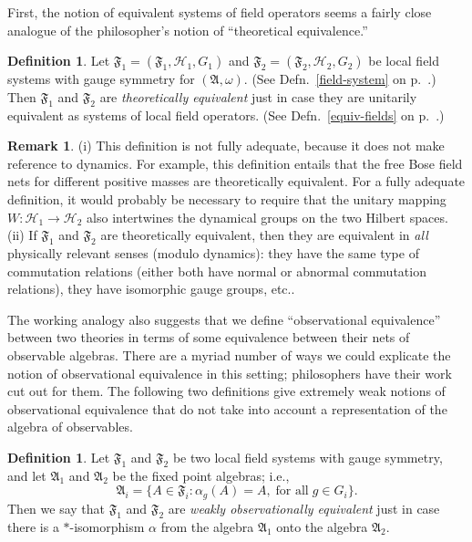 \documentclass[11pt]{article}
\newcommand{\alg}[1]{\mathfrak{#1}}
\theoremstyle{definition}
\theoremstyle{definition}
\newtheorem{defn}[thm]{Definition}
\newtheorem{rema}[thm]{Remark}
\theoremstyle{remark}
\def\2#1{{\mathcal #1}}
\def\al#1{{\mathfrak #1}}
\def\a{\alpha} \def\b{\beta} \def\g{\gamma} \def\d{\delta}
\def\om{\omega} \def\Om{\Omega} \def\dd{\partial} \def\D{\Delta}
\begin{document}
First, the notion of equivalent systems of field operators seems a
fairly close analogue of the philosopher's notion of ``theoretical
equivalence.''
\begin{defn} Let $\alg{F}_1=(\alg{F}_1,\2H_1,G _1)$ and
  $\alg{F}_2=(\alg{F}_2,\2H_2,G_2)$ be local field systems with gauge
  symmetry for $(\al A,\om )$.  (See Defn.\ \ref{field-system} on p.\
  \pageref{field-system}.) Then $\alg{F}_1$ and $\alg{F}_2$ are
  \emph{theoretically equivalent} just in case they are unitarily
  equivalent as systems of local field operators.  (See Defn.\
  \ref{equiv-fields} on p.\ \pageref{equiv-fields}.)  \end{defn}

\begin{rema} (i) This definition is not fully adequate, because it
  does not make reference to dynamics.  For example, this definition
  entails that the free Bose field nets for different positive masses
  are theoretically equivalent.  For a fully adequate definition, it
  would probably be necessary to require that the unitary mapping
  $W:\2H _1\to \2H _2$ also intertwines the dynamical groups on the
  two Hilbert spaces. (ii) If $\al F_1$ and $\al F_2$ are
  theoretically equivalent, then they are equivalent in \emph{all}
  physically relevant senses (modulo dynamics): they have the same
  type of commutation relations (either both have normal or abnormal
  commutation relations), they have isomorphic gauge groups, etc..
\end{rema}



The working analogy also suggests that we define ``observational
equivalence'' between two theories in terms of some equivalence
between their nets of observable algebras.  There are a myriad number
of ways we could explicate the notion of observational equivalence in
this setting; philosophers have their work cut out for them.  The
following two definitions give extremely weak notions of observational
equivalence that do not take into account a representation of the
algebra of observables.

\begin{defn}
  Let $\al F_1$ and $\al F_2$ be two local field systems with gauge
  symmetry, and let $\al A_1$ and $\al A_2$ be the fixed point
  algebras; i.e., 
$$ \al A_i =\{ A\in \al F_i :\a _g(A)=A,\; \mbox{for all}\; g\in
G_i \} .$$ Then we say that $\al F_1$ and $\al F_2$ are \emph{weakly
  observationally equivalent} just in case there is a $*$-isomorphism
$\a$ from the algebra $\al A_1$ onto the algebra $\al A_2$.
\end{defn}
\end{document}
